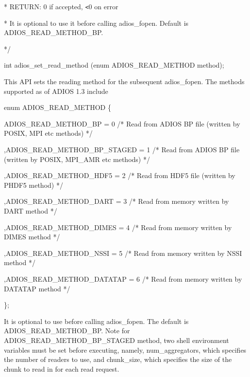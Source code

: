 \vspace{10pt}
*  RETURN:       0 if accepted, \texttt{<}0 on error

\vspace{10pt}
\parindent=7pt
*  It is optional to use it before calling adios\_fopen. Default is ADIOS\_READ\_METHOD\_BP.

\vspace{10pt}
\parindent=3pt
*/

\vspace{10pt}
\parindent=0pt
int adios\_set\_read\_method (enum ADIOS\_READ\_METHOD method);

\vspace{10pt}
This API sets the reading method for the subsequent adios\_fopen. The methods supported 
as of ADIOS 1.3 include

\vspace{22pt}
enum ADIOS\_READ\_METHOD \{

\vspace{10pt}
\parindent=32pt
ADIOS\_READ\_METHOD\_BP = 0    /* Read from ADIOS BP file (written by POSIX, MPI 
etc methods) */

\vspace{10pt}
\parindent=28pt
,ADIOS\_READ\_METHOD\_BP\_STAGED = 1    /* Read from ADIOS BP file (written by 
POSIX, MPI\_AMR etc methods) */

\vspace{10pt}
,ADIOS\_READ\_METHOD\_HDF5 = 2    /* Read from HDF5 file (written by PHDF5 method) 
              */

\vspace{10pt}
\parindent=57pt
,ADIOS\_READ\_METHOD\_DART = 3    /* Read from memory written by DART method   
                  */

\vspace{10pt}
\parindent=28pt
,ADIOS\_READ\_METHOD\_DIMES = 4    /* Read from memory written by DIMES method 
                   */

\vspace{10pt}
,ADIOS\_READ\_METHOD\_NSSI = 5    /* Read from memory written by NSSI method   
                  */

\vspace{10pt}
\parindent=57pt
,ADIOS\_READ\_METHOD\_DATATAP = 6    /* Read from memory written by DATATAP method 
                 */

\vspace{10pt}
\parindent=0pt
\};

\vspace{22pt}
It is optional to use before calling adios\_fopen. The default is ADIOS\_READ\_METHOD\_BP. 
Note for ADIOS\_READ\_METHOD\_BP\_STAGED method, two shell environment variables 
must be set before executing, namely, num\_aggregators, which specifies the number 
of readers to use, and chunk\_size, which specifies the size of the chunk to read 
in for each read request.

